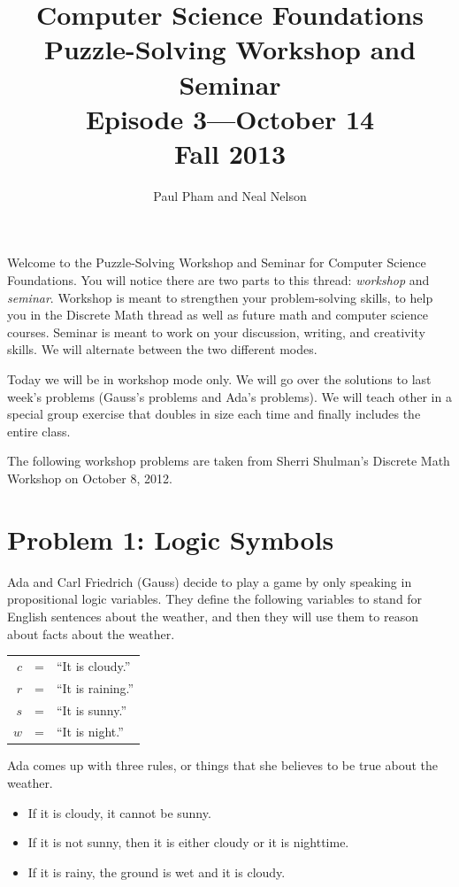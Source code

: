 \documentclass{article}
\title{Computer Science Foundations\\ Puzzle-Solving Workshop and Seminar\\
\large{Episode 3---October 14}\\
Fall 2013}
\author{Paul Pham and Neal Nelson}
\begin{document}
\maketitle

Welcome to the Puzzle-Solving Workshop and Seminar for
Computer Science Foundations. You will notice there are
two parts to this thread: \emph{workshop} and \emph{seminar}.
Workshop is meant to strengthen your problem-solving skills,
to help you in the Discrete Math thread as well as future
math and computer science courses. Seminar is meant to
work on your discussion, writing, and creativity skills.
We will alternate between the two different modes.

Today we will be in workshop mode only. We will go over the
solutions to last week's problems (Gauss's problems and
Ada's problems). We will teach other in a special
group exercise that doubles in size each time and
finally includes the entire class.

The following workshop problems are taken from
Sherri Shulman's Discrete Math Workshop on October 8, 2012.

\section{Problem 1: Logic Symbols}

Ada and Carl Friedrich (Gauss) decide to play a game by only speaking in
propositional logic variables. They define the following
variables to stand for English sentences about the weather,
and then they will use them to reason about facts about
the weather.

\begin{tabular}{|r|c|l|}
$c$ & = & ``It is cloudy.'' \\
$r$ & = & ``It is raining.'' \\
$s$ & = & ``It is sunny.'' \\
$w$ & = & ``It is night.''
\end{tabular}

Ada comes up with three rules, or things that she
believes to be true about the weather.

\begin{itemize}
\item If it is cloudy, it cannot be sunny.
\item If it is not sunny, then it is either cloudy or it is nighttime.
\item If it is rainy, the ground is wet and it is cloudy.
\end{itemize}
\end{document}

